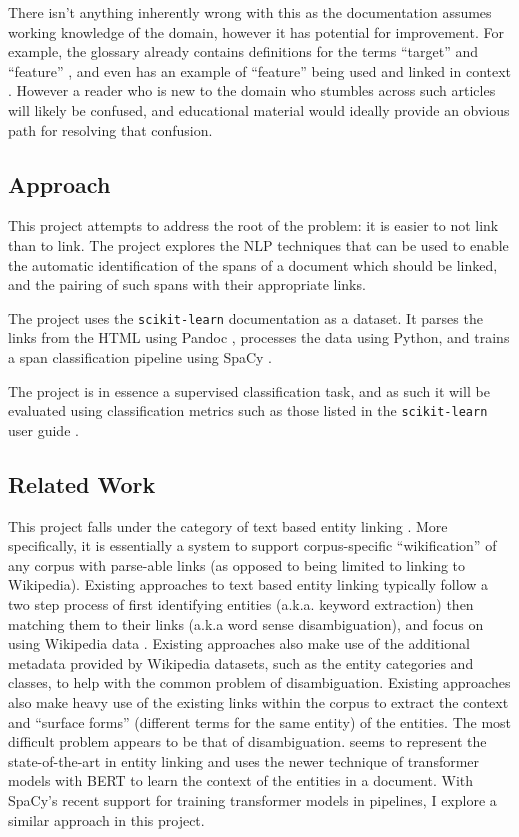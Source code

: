 \documentclass[manuscript,screen,review]{acmart}
\begin{document}
There isn't anything inherently wrong with this as the documentation
assumes working knowledge of the domain, however it has potential for
improvement. For example, the glossary already contains definitions
for the terms ``target'' \citep{scikit-learn-gloss-term-Y} and ``feature''
\citep{scikit-learn-gloss-term-feature}, and even has an example of
``feature'' being used and linked in context
\citep{scikit-learn-gloss-term-X}. However a reader who is new to the
domain who stumbles across such articles will likely be confused, and
educational material would ideally provide an obvious path for
resolving that confusion.

\subsection*{Approach}
\label{sec:orgd904059}
This project attempts to address the root of the problem: it is easier
to not link than to link. The project explores the NLP techniques that
can be used to enable the automatic identification of the spans of a
document which should be linked, and the pairing of such spans with
their appropriate links.

The project uses the \texttt{scikit-learn} \citep{scikit-learn} documentation
as a dataset. It parses the links from the HTML using Pandoc
\citep{pandoc-homepage}, processes the data using Python, and trains a
span classification pipeline using SpaCy \citep{spacy}.

The project is in essence a supervised classification task, and as
such it will be evaluated using classification metrics such as those
listed in the \texttt{scikit-learn} user guide
\citep{scikit-learn-user-guide-classification-metrics}.

\subsection*{Related Work}
\label{sec:org93e8327}
This project falls under the category of text based entity linking
\citep{wikipedia-entity-linking}. More specifically, it is essentially
a system to support corpus-specific ``wikification'' of any corpus with
parse-able links (as opposed to being limited to linking to
Wikipedia). Existing approaches to text based entity linking typically
follow a two step process of first identifying entities
(a.k.a. keyword extraction) then matching them to their links (a.k.a
word sense disambiguation), and focus on using Wikipedia data
\citep{cucerzan-2007-large,wikify-mihalcea,wikigum}. Existing
approaches also make use of the additional metadata provided by
Wikipedia datasets, such as the entity categories and classes, to help
with the common problem of disambiguation. Existing approaches also
make heavy use of the existing links within the corpus to extract the
context and ``surface forms'' (different terms for the same entity) of
the entities. The most difficult problem appears to be that of
disambiguation. \citeauthor{entity-linking-bert} seems to represent
the state-of-the-art in entity linking and uses the newer technique of
transformer models with BERT to learn the context of the entities in a
document. With SpaCy's recent support for training transformer models
in pipelines, I explore a similar approach in this project.
\end{document}
